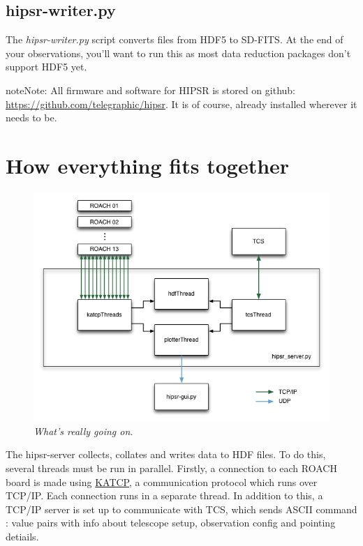 \documentclass[letterpaper,10pt,english]{sphinxmanual}
\begin{document}
\subsection{hipsr-writer.py}
\label{user_guide:hipsr-writer-py}
The \emph{hipsr-writer.py} script converts files from HDF5 to SD-FITS. At the end of your observations, you'll want to run this as most data reduction packages don't support HDF5 yet.

\begin{notice}{note}{Note:}
All firmware and software for HIPSR is stored on github: \href{https://github.com/telegraphic/hipsr}{https://github.com/telegraphic/hipsr}.
It is of course, already installed wherever it needs to be.
\end{notice}


\section{How everything fits together}
\label{user_guide:how-everything-fits-together}\begin{figure}[htbp]
\centering
\capstart

\includegraphics{hipsr-server.png}
\caption{\emph{What's really going on.}}\end{figure}

The hipsr-server collects, collates and writes data to HDF files. To do this, several threads must be run in parallel. Firstly, a connection to each ROACH board is made using \href{https://casper.berkeley.edu/wiki/KATCP}{KATCP}, a communication
protocol which runs over TCP/IP. Each connection runs in a separate thread. In addition to this, a
TCP/IP server is set up to communicate with TCS, which sends ASCII command : value pairs with info
about telescope setup, observation config and pointing detiails.
\end{document}
